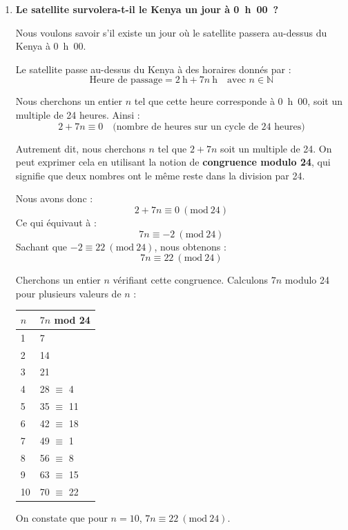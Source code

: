 \documentclass{article}
\begin{document}
\begin{enumerate}
\begin{enumerate}
        \item \textbf{Le satellite survolera-t-il le Kenya un jour à 0~h~00~?}

        Nous voulons savoir s'il existe un jour où le satellite passera au-dessus du Kenya à 0~h~00.

        Le satellite passe au-dessus du Kenya à des horaires donnés par :
        \[
        \text{Heure de passage} = 2~\text{h} + 7n~\text{h} \quad \text{avec } n \in \mathbb{N}
        \]

        Nous cherchons un entier $n$ tel que cette heure corresponde à 0~h~00, soit un multiple de 24 heures. Ainsi :
        \[
        2 + 7n \equiv 0 \quad \text{(nombre de heures sur un cycle de 24 heures)}
        \]

        Autrement dit, nous cherchons $n$ tel que $2 + 7n$ soit un multiple de 24. On peut exprimer cela en utilisant la notion de \textbf{congruence modulo 24}, qui signifie que deux nombres ont le même reste dans la division par 24.

        Nous avons donc :
        \[
        2 + 7n \equiv 0 \ (\text{mod}\ 24)
        \]
        Ce qui équivaut à :
        \[
        7n \equiv -2 \ (\text{mod}\ 24)
        \]
        Sachant que $-2 \equiv 22 \ (\text{mod}\ 24)$, nous obtenons :
        \[
        7n \equiv 22 \ (\text{mod}\ 24)
        \]

        Cherchons un entier $n$ vérifiant cette congruence. Calculons $7n$ modulo 24 pour plusieurs valeurs de $n$ :

        \begin{tabular}{l|l}
        $n$ & $7n$ mod 24 \\
        \hline
        1 & 7 \\
        2 & 14 \\
        3 & 21 \\
        4 & 28 $\equiv$ 4 \\
        5 & 35 $\equiv$ 11 \\
        6 & 42 $\equiv$ 18 \\
        7 & 49 $\equiv$ 1 \\
        8 & 56 $\equiv$ 8 \\
        9 & 63 $\equiv$ 15 \\
        10 & 70 $\equiv$ 22 \\
        \end{tabular}

        On constate que pour $n = 10$, $7n \equiv 22 \ (\text{mod}\ 24)$.


\end{enumerate}
\end{enumerate}
\end{document}
